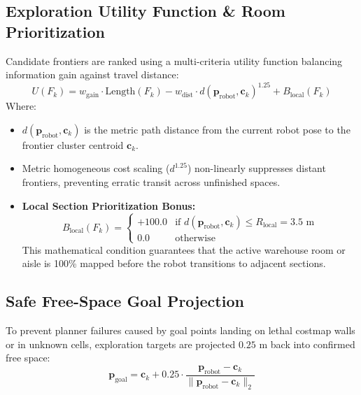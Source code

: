 \documentclass[10pt,a4paper]{article}
\begin{document}
\subsection{Exploration Utility Function \& Room Prioritization}
Candidate frontiers are ranked using a multi-criteria utility function balancing information gain against travel distance:
\begin{equation}
U(F_k) = w_{\text{gain}} \cdot \text{Length}(F_k) - w_{\text{dist}} \cdot d(\mathbf{p}_{\text{robot}}, \mathbf{c}_k)^{1.25} + B_{\text{local}}(F_k)
\end{equation}
Where:
\begin{itemize}
    \item $d(\mathbf{p}_{\text{robot}}, \mathbf{c}_k)$ is the metric path distance from the current robot pose to the frontier cluster centroid $\mathbf{c}_k$.
    \item Metric homogeneous cost scaling ($d^{1.25}$) non-linearly suppresses distant frontiers, preventing erratic transit across unfinished spaces.
    \item \textbf{Local Section Prioritization Bonus:}
    \begin{equation}
    B_{\text{local}}(F_k) = \begin{cases} +100.0 & \text{if } d(\mathbf{p}_{\text{robot}}, \mathbf{c}_k) \le R_{\text{local}} = 3.5\text{ m} \\ 0.0 & \text{otherwise} \end{cases}
    \end{equation}
    This mathematical condition guarantees that the active warehouse room or aisle is 100\% mapped before the robot transitions to adjacent sections.
\end{itemize}

\subsection{Safe Free-Space Goal Projection}
To prevent planner failures caused by goal points landing on lethal costmap walls or in unknown cells, exploration targets are projected $0.25\text{ m}$ back into confirmed free space:
\begin{equation}
\mathbf{p}_{\text{goal}} = \mathbf{c}_k + 0.25 \cdot \frac{\mathbf{p}_{\text{robot}} - \mathbf{c}_k}{\|\mathbf{p}_{\text{robot}} - \mathbf{c}_k\|_2}
\end{equation}
\end{document}
